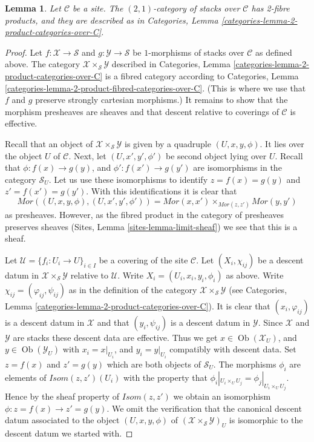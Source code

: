 \documentclass{stacks-project}
\theoremstyle{plain}
\newtheorem{lemma}[subsection]{Lemma}
\theoremstyle{definition}
\theoremstyle{remark}
\numberwithin{equation}{subsection}
\def\Ob{\mathop{\mathrm{Ob}}\nolimits}
\begin{document}
\begin{lemma}
\label{lemma-2-product-stacks}
Let $\mathcal{C}$ be a site.
The $(2, 1)$-category of stacks over $\mathcal{C}$
has 2-fibre products, and they are described as in
Categories, Lemma \ref{categories-lemma-2-product-categories-over-C}.
\end{lemma}

\begin{proof}
Let $f : \mathcal{X} \to \mathcal{S}$ and
$g : \mathcal{Y} \to \mathcal{S}$ be
$1$-morphisms of stacks over $\mathcal{C}$
as defined above. The category
$\mathcal{X} \times_\mathcal{S} \mathcal{Y}$
described in
Categories, Lemma \ref{categories-lemma-2-product-categories-over-C} is a
fibred category according to
Categories, Lemma \ref{categories-lemma-2-product-fibred-categories-over-C}.
(This is where we use that $f$ and $g$ preserve strongly cartesian
morphisms.) It remains to show that the morphism presheaves are sheaves
and that descent relative to coverings of $\mathcal{C}$ is effective.

\medskip\noindent
Recall that an object of $\mathcal{X} \times_\mathcal{S} \mathcal{Y}$
is given by a quadruple $(U, x, y, \phi)$.
It lies over the object
$U$ of $\mathcal{C}$. Next, let $(U, x', y', \phi')$ be second
object lying over $U$.
Recall that $\phi : f(x) \to g(y)$, and $\phi' : f(x') \to g(y')$
are isomorphisms in the category $\mathcal{S}_U$. Let us
use these isomorphisms to identify $z = f(x) = g(y)$ and
$z' = f(x') = g(y')$. With this identifications
it is clear that
$$
\mathit{Mor}((U, x, y, \phi), (U, x', y', \phi'))
=
\mathit{Mor}(x, x')
\times_{\mathit{Mor}(z, z')}
\mathit{Mor}(y, y')
$$
as presheaves. However, as the fibred product in the category of
presheaves preserves sheaves (Sites, Lemma \ref{sites-lemma-limit-sheaf})
we see that this is a sheaf.

\medskip\noindent
Let $\mathcal{U} = \{f_i : U_i \to U\}_{i \in I}$ be a covering of the site
$\mathcal{C}$. Let $(X_i, \chi_{ij})$ be a descent datum
in $\mathcal{X} \times_\mathcal{S} \mathcal{Y}$ relative to $\mathcal{U}$.
Write $X_i = (U_i, x_i, y_i, \phi_i)$ as above. Write
$\chi_{ij} = (\varphi_{ij}, \psi_{ij})$ as in the definition of
the category $\mathcal{X} \times_\mathcal{S} \mathcal{Y}$ (see
Categories, Lemma \ref{categories-lemma-2-product-categories-over-C}).
It is clear that $(x_i, \varphi_{ij})$ is a descent datum in
$\mathcal{X}$ and that $(y_i, \psi_{ij})$ is a descent datum in
$\mathcal{Y}$. Since $\mathcal{X}$ and $\mathcal{Y}$ are stacks these
descent data are effective. Thus we get
$x \in \Ob(\mathcal{X}_U)$, and $y \in \Ob(\mathcal{Y}_U)$
with $x_i = x|_{U_i}$, and $y_i = y|_{U_i}$ compatibly with descent data.
Set $z = f(x)$ and $z' = g(y)$ which are both objects of $\mathcal{S}_U$.
The morphisms $\phi_i$ are elements of
$\mathit{Isom}(z, z')(U_i)$ with the property that
$\phi_i|_{U_i \times_U U_j} = \phi_j|_{U_i \times_U U_j}$.
Hence by the sheaf property of $\mathit{Isom}(z, z')$
we obtain an isomorphism $\phi : z = f(x) \to z' = g(y)$.
We omit the verification that the canonical descent datum associated to
the object $(U, x, y, \phi)$ of
$(\mathcal{X} \times_\mathcal{S} \mathcal{Y})_U$ is isomorphic
to the descent datum we started with.
\end{proof}
\end{document}
